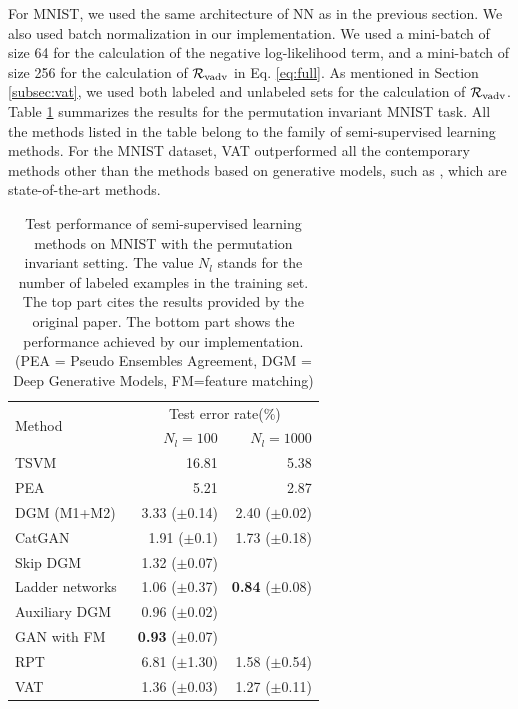 \documentclass[10pt,journal,compsoc]{IEEEtran}
\begin{document}
For MNIST, we used the same architecture of NN as in the previous section. We also used batch normalization in our implementation.
We used a mini-batch of size 64 for the calculation of the negative log-likelihood term, and a mini-batch of size 256 for the calculation of $\mathcal{R}_{\rm vadv}$ in Eq. \eqref{eq:full}. As mentioned in Section \ref{subsec:vat}, we used both labeled and unlabeled sets for the calculation of  $\mathcal{R}_{\rm vadv}$. 
Table \ref{tab:semisupMNIST} summarizes the results for the permutation invariant MNIST task. All the methods listed in the table belong to the family of semi-supervised learning methods. For the MNIST dataset, VAT outperformed all the contemporary methods other than the methods based on generative models, such as \cite{rasmus2015semi,maaloe2016auxiliary,salimans2016improved}, which are state-of-the-art methods.
\begin{table}[ht]
  \centering
		\caption{\label{tab:semisupMNIST}Test performance of semi-supervised learning methods on MNIST with the permutation invariant setting.
        The value $N_l$ stands for the number of labeled examples in the training set.   
        The top part cites the results provided by the original paper. 
        The bottom part shows the performance achieved by our implementation. 
        (PEA = Pseudo Ensembles Agreement, DGM = Deep Generative Models, FM=feature matching) }
		\begin{tabular}{lrr}
			\toprule
			\multirow{2}{*}{Method} & \multicolumn{2}{c}{Test error rate(\%)}  \\
		     & $N_l=100$ &  $N_l=1000$ \\
			\midrule
            TSVM \cite{collobert2006large} & 16.81 & 5.38\\
            PEA \cite{bachman2014learning} & 5.21 & 2.87\\ 
            DGM (M1+M2) \cite{kingma2014semi} & 3.33 ($\pm$0.14) & 2.40 ($\pm$0.02)\\

            CatGAN \cite{springenberg2015unsupervised} & 1.91 ($\pm$0.1)& 1.73 ($\pm$0.18) \\
            Skip DGM \cite{maaloe2016auxiliary} & 1.32 ($\pm$0.07) &  \\
            Ladder networks~\cite{rasmus2015semi} & 1.06 ($\pm$0.37) & \textbf{0.84} ($\pm$0.08)\\
			Auxiliary DGM~\cite{maaloe2016auxiliary}& 0.96 ($\pm$0.02)& \\
            GAN with FM \cite{salimans2016improved}& \textbf{0.93} ($\pm$0.07) & \\
            \midrule
            RPT & 6.81 ($\pm$1.30) & 1.58 ($\pm$0.54)\\ %
            VAT & 1.36 ($\pm$0.03) & 1.27 ($\pm$0.11) \\ %
			\bottomrule
		\end{tabular}
\end{table}
\end{document}
